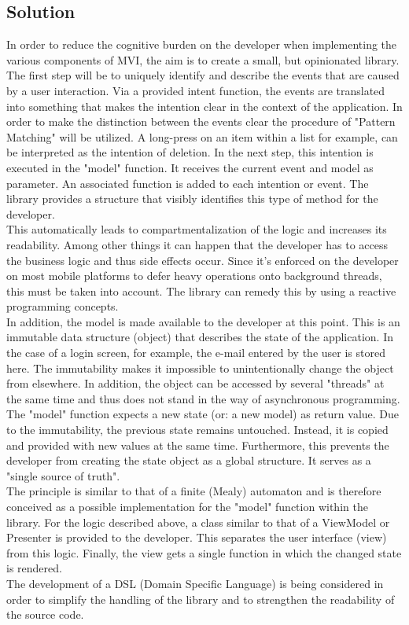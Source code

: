 \subsection{Solution}
\label{subsec:solution}

In order to reduce the cognitive burden on the developer when implementing the various components of MVI, the aim 
is to create a small, but opinionated library.
\\
The first step will be to uniquely identify and describe the events that are caused by a user interaction.
Via a provided intent function, the events are translated into something that makes the intention clear in the context of the application.
In order to make the distinction between the events clear the procedure of "Pattern Matching" 
\cite{wikiPatterMatching,scalaDocsPatterMatching}
will be utilized. A long-press on an item within a list for example, can be interpreted as the intention of deletion. In the next step, this intention is executed in 
the "model" function. It receives the current event and model as parameter. An associated function is added to each intention or event. The library provides a structure 
that visibly identifies this type of method for the developer.
\\
This automatically leads to compartmentalization of the logic and increases its readability. Among other things it can happen that the developer has to access the business 
logic
\cite{wikic2BusinessLogic} 
and thus side effects occur. Since it's enforced on the developer on most mobile platforms to defer heavy operations onto background threads, this must be taken
into account. The library can remedy this by using a reactive programming concepts.
\\
In addition, the model is made available to the developer
at this point. This is an immutable data structure (object) that describes the state of the application. In the case of a login screen, for example, the e-mail 
entered by the user is stored here. The immutability makes it impossible to unintentionally change the object from elsewhere. In addition, the object can be accessed 
by several "threads" at the same time and thus does not stand in the way of asynchronous programming. The "model" function expects a new state (or: a new model) 
as return value. Due to the immutability, the previous state remains untouched. Instead, it is copied and provided with new values at the same time. Furthermore, 
this prevents the developer from creating the state object as a global structure. It serves as a "single source of truth".
\\
The principle is similar to that of a finite (Mealy) automaton and is therefore conceived as a possible implementation for the "model" function within the library. 
For the logic described above, a class similar to that of a ViewModel or Presenter is provided to the developer. This separates the user interface (view) from this logic.
Finally, the view gets a single function in which the changed state is rendered.
\\
The development of a DSL (Domain Specific Language) is being considered in order to simplify the handling of the library and to strengthen the readability 
of the source code.


